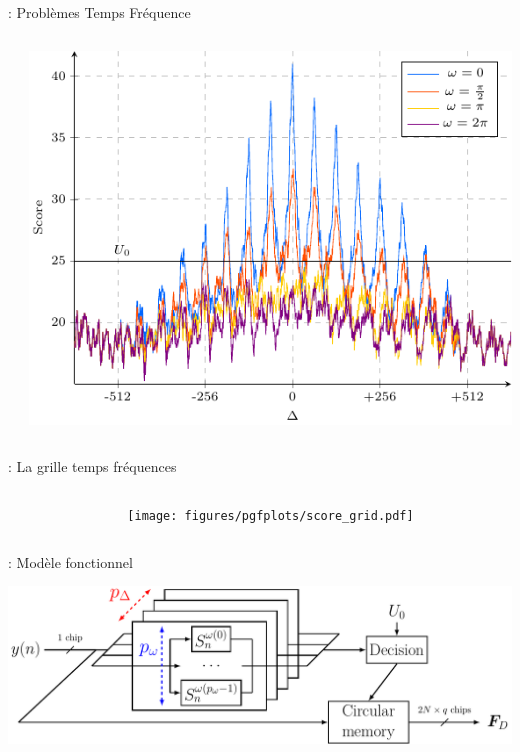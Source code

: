 \documentclass[../main.tex]{subfiles}
\begin{document}
\begin{frame}{\subsecname : {Problèmes Temps Fréquence}}
  \begin{columns}
    \begin{column}{.4\linewidth}

    \end{column}
    \begin{column}{.6\linewidth}
      \centering
      \includegraphics[width=\linewidth, height=.75\textheight, keepaspectratio=true]{figures/pgfplots/score_function_stdl.pdf}
    \end{column}
  \end{columns}
\end{frame}

\begin{frame}{\subsecname : {La grille temps fréquences}}
  \begin{columns}
    \begin{column}{.4\linewidth}

    \end{column}
    \begin{column}{.6\linewidth}
      \centering
      \texttt{[image: figures/pgfplots/score\_grid.pdf]}
    \end{column}
  \end{columns}
\end{frame}

\begin{frame}{\subsecname : {Modèle fonctionnel}}
  \begin{center}
    \includegraphics[width=.9\linewidth, height=.75\textheight, keepaspectratio=true]{figures/tikzpicture/funct_view_detection_stdl.pdf}
  \end{center}
\end{frame}
\end{document}
